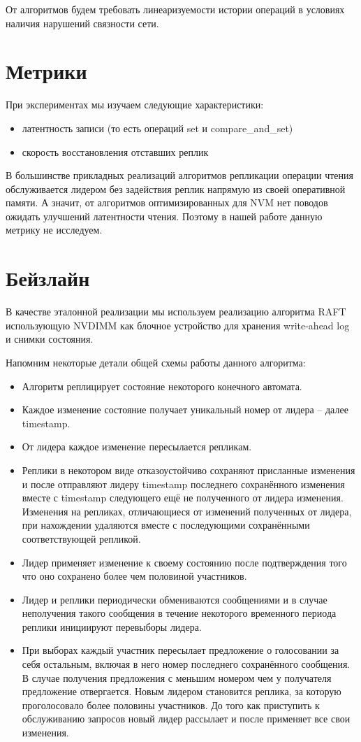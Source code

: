 \documentclass[pdftex,ptm,12pt,a4paper]{report}
\theoremstyle{definition}
\begin{document}
От алгоритмов будем требовать линеаризуемости \cite{linearizability} истории операций в условиях наличия нарушений связности сети.

\section{Метрики}
При экспериментах мы изучаем следующие характеристики:
\begin{itemize}
    \item латентность записи (то есть операций set и compare\_and\_set)
    \item скорость восстановления отставших реплик
\end{itemize}

В большинстве прикладных реализаций алгоритмов репликации операции чтения обслуживается лидером без задействия реплик напрямую из своей оперативной памяти.
А значит, от алгоритмов оптимизированных для NVM нет поводов ожидать улучшений латентности чтения. Поэтому в нашей работе данную метрику не исследуем.

\section{Бейзлайн}
В качестве эталонной реализации мы используем реализацию алгоритма RAFT \cite{raftpaper} использующую NVDIMM как блочное устройство
для хранения write-ahead log и снимки состояния.

\label{baseline}
Напомним некоторые детали общей схемы работы данного алгоритма:
\begin{itemize}
    \item Алгоритм реплицирует состояние некоторого конечного автомата.
    \item Каждое изменение состояние получает уникальный номер от лидера -- далее timestamp.
    \item От лидера каждое изменение пересылается репликам.
    \item Реплики в некотором виде отказоустойчиво сохраняют присланные изменения и после отправляют лидеру timestamp последнего сохранённого изменения вместе с timestamp следующего ещё не
        полученного от лидера изменения. Изменения на репликах, отличающиеся от изменений полученных от лидера, при нахождении удаляются вместе
    с последующими сохранёнными соответствующей репликой.
    \item Лидер применяет изменение к своему состоянию после подтверждения того что оно сохранено более чем половиной участников.
    \item Лидер и реплики периодически обмениваются сообщениями и в случае неполучения такого сообщения в течение некоторого временного периода реплики инициируют перевыборы лидера.
    \item При выборах каждый участник пересылает предложение о голосовании за себя остальным, включая в него номер последнего сохранённого сообщения. В случае получения предложения с меньшим
    номером чем у получателя предложение отвергается. Новым лидером становится реплика, за которую проголосовало более половины участников. До того как приступить к обслуживанию
    запросов новый лидер рассылает и после применяет все свои изменения.
\end{itemize}
\end{document}
